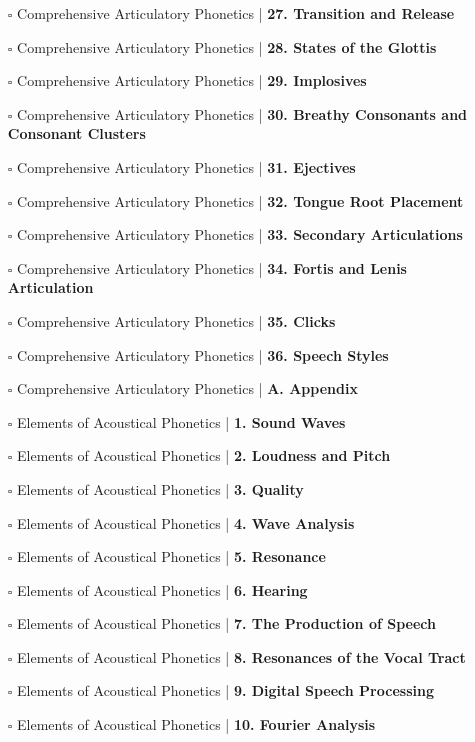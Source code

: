 \documentclass[a4, landscape, 12pt]{article}
\newcommand{\checkbox}{$\square$}%
\begin{document}
\begin{itemize}
{}
\item [\checkbox]  Comprehensive Articulatory Phonetics | \textbf{ 27. Transition and Release
}
\item [\checkbox]  Comprehensive Articulatory Phonetics | \textbf{ 28. States of the Glottis
}
\item [\checkbox]  Comprehensive Articulatory Phonetics | \textbf{ 29. Implosives
}
\item [\checkbox]  Comprehensive Articulatory Phonetics | \textbf{ 30. Breathy Consonants and Consonant Clusters
}
\item [\checkbox]  Comprehensive Articulatory Phonetics | \textbf{ 31. Ejectives
}
\item [\checkbox]  Comprehensive Articulatory Phonetics | \textbf{ 32. Tongue Root Placement
}
\item [\checkbox]  Comprehensive Articulatory Phonetics | \textbf{ 33. Secondary Articulations
}
\item [\checkbox]  Comprehensive Articulatory Phonetics | \textbf{ 34. Fortis and Lenis Articulation
}
\item [\checkbox]  Comprehensive Articulatory Phonetics | \textbf{ 35. Clicks
}
\item [\checkbox]  Comprehensive Articulatory Phonetics | \textbf{ 36. Speech Styles
}
\item [\checkbox]  Comprehensive Articulatory Phonetics | \textbf{ A. Appendix
}
\item [\checkbox]  Elements of Acoustical Phonetics | \textbf{ 1. Sound Waves
}
\item [\checkbox]  Elements of Acoustical Phonetics | \textbf{ 2. Loudness and Pitch
}
\item [\checkbox]  Elements of Acoustical Phonetics | \textbf{ 3. Quality
}
\item [\checkbox]  Elements of Acoustical Phonetics | \textbf{ 4. Wave Analysis
}
\item [\checkbox]  Elements of Acoustical Phonetics | \textbf{ 5. Resonance
}
\item [\checkbox]  Elements of Acoustical Phonetics | \textbf{ 6. Hearing
}
\item [\checkbox]  Elements of Acoustical Phonetics | \textbf{ 7. The Production of Speech
}
\item [\checkbox]  Elements of Acoustical Phonetics | \textbf{ 8. Resonances of the Vocal Tract
}
\item [\checkbox]  Elements of Acoustical Phonetics | \textbf{ 9. Digital Speech Processing
}
\item [\checkbox]  Elements of Acoustical Phonetics | \textbf{ 10. Fourier Analysis
}
\end{itemize}
\end{document}
